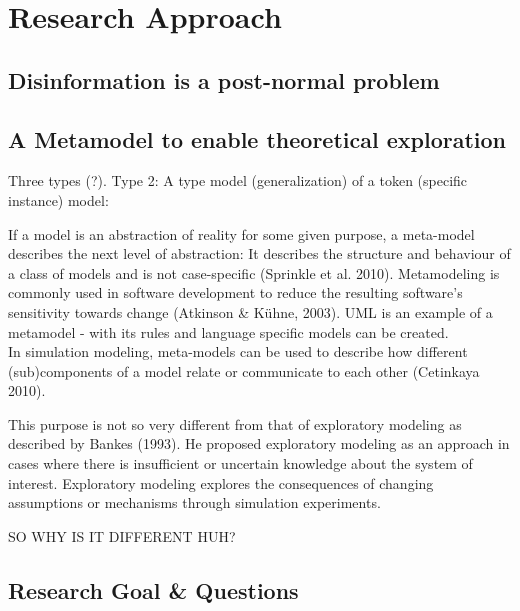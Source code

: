 \section{Research Approach}

\subsection{Disinformation is a post-normal problem}


\subsection{A Metamodel to enable theoretical exploration}


Three types (?). Type 2: A type model (generalization) of a token (specific instance) model:

If a model is an abstraction of reality for some given purpose, a meta-model describes the next level of abstraction: It describes the structure and behaviour of a class of models and is not case-specific (Sprinkle et al. 2010). Metamodeling is commonly used in software development to reduce the resulting software's sensitivity towards change (Atkinson \& Kühne, 2003). UML is an example of a metamodel - with its rules and language specific models can be created. \\

In simulation modeling, meta-models can be used to describe how different (sub)components of a model relate or communicate to each other (Cetinkaya 2010). 


This purpose is not so very different from that of exploratory modeling as described by Bankes (1993). He proposed exploratory modeling as an approach in cases where there is insufficient or uncertain knowledge about the system of interest. Exploratory modeling explores the consequences of changing assumptions or mechanisms through simulation experiments.

SO WHY IS IT DIFFERENT HUH?


\subsection{Research Goal \& Questions}